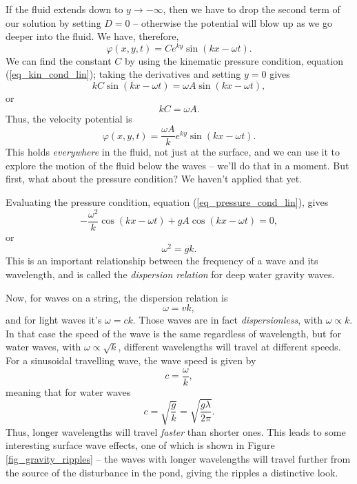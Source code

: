 If the fluid extends down to $y \to -\infty$, then we have to drop the second term of our solution by setting $D = 0$ -- otherwise the potential will blow up as we go deeper into the fluid.  We have, therefore, 
\[
\varphi(x, y, t) = C e^{ky} \sin (kx - \omega t).
\]
We can find the constant $C$ by using the kinematic pressure condition, equation (\ref{eq_kin_cond_lin}); taking the derivatives and setting $y = 0$ gives
\[
kC \sin(kx - \omega t) = \omega A \sin (kx - \omega t),
\]
or
\begin{equation}
kC = \omega A.
\end{equation}
Thus, the velocity potential is
\begin{equation}
\varphi(x, y, t) = \frac{\omega A}{k} e^{ky} \sin (kx - \omega t).
\end{equation}
This holds \emph{everywhere} in the fluid, not just at the surface, and we can use it to explore the motion of the fluid below the waves -- we'll do that in a moment.  But first, what about the pressure condition?  We haven't applied that yet.

Evaluating the pressure condition, equation (\ref{eq_pressure_cond_lin}), gives
\[
-\frac{\omega^2}{k} \cos(kx - \omega t) + gA \cos(kx - \omega t) = 0,
\]
or
\begin{equation}
\label{eq_disp_relation}
\boxed{
\omega^2 = gk.
}
\end{equation}
This is an important relationship between the frequency of a wave and its wavelength, and is called the \emph{dispersion relation} for deep water gravity waves.

Now, for waves on a string, the dispersion relation is
\[
\omega = vk,
\]
and for light waves it's $\omega = ck$.  Those waves are in fact \emph{dispersionless}, with $\omega \propto k$.  In that case the speed of the wave is the same regardless of wavelength, but for water waves, with $\omega \propto \sqrt{k}$, different wavelengths will travel at different speeds.  For a sinusoidal travelling wave, the wave speed is given by
\begin{equation}
c = \frac{\omega}{k},
\end{equation}
meaning that for water waves
\[
c = \sqrt{\frac{g}{k}} = \sqrt{\frac{g\lambda}{2\pi}}.
\]
Thus, longer wavelengths will travel \emph{faster} than shorter ones.  This leads to some interesting surface wave effects, one of which is shown in Figure \ref{fig_gravity_ripples} -- the waves with longer wavelengths will travel further from the source of the disturbance in the pond, giving the ripples a distinctive look.


